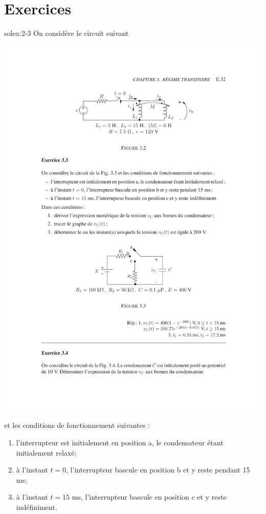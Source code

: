 
\section{Exercices}

\begin{exwithsol}{solex:2-3}
	\label{ex:2-3}
On consid\`ere le circuit suivant 
\begin{center}
	\includegraphics[width=0.85\linewidth]{exercices/ex-3-3}
\end{center}
et les conditions de fonctionnement suivantes :
\begin{enumerate}
	\item l'interrupteur est initialement en position a, le condensateur
	\'etant initialement relax\'e;
	\item \`a l'instant  $t=0$, l'interrupteur bascule en position b et y reste pendant 15 ms;
	\item \`a l'instant  $t=15$ ms, l'interrupteur bascule en position c et y reste ind\'efiniment. 

\end{enumerate}
\end{exwithsol}
